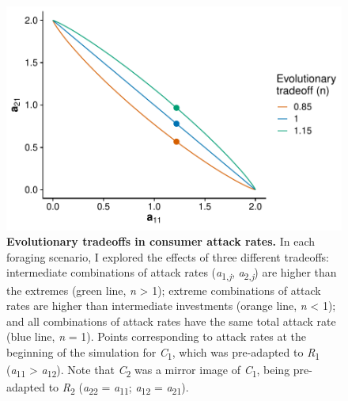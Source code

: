 \begin{figure}
\centering
\includegraphics{Fig_2_Tradeoffs.pdf}
\caption{\label{fig:tradeoff}\textbf{Evolutionary tradeoffs in consumer
attack rates.} In each foraging scenario, I explored the effects of
three different tradeoffs: intermediate combinations of attack rates
(\emph{a}\textsubscript{1,\emph{j}}, \emph{a}\textsubscript{2,\emph{j}})
are higher than the extremes (green line, \emph{n} \textgreater{} 1);
extreme combinations of attack rates are higher than intermediate
investments (orange line, \emph{n} \textless{} 1); and all combinations
of attack rates have the same total attack rate (blue line, \emph{n} =
1). Points corresponding to attack rates at the beginning of the
simulation for \emph{C}\textsubscript{1}, which was pre-adapted to
\emph{R}\textsubscript{1} (\emph{a}\textsubscript{11} \textgreater{}
\emph{a}\textsubscript{12}). Note that \emph{C}\textsubscript{2} was a
mirror image of \emph{C}\textsubscript{1}, being pre-adapted to
\emph{R}\textsubscript{2} (\emph{a}\textsubscript{22} =
\emph{a}\textsubscript{11}; \emph{a}\textsubscript{12} =
\emph{a}\textsubscript{21}).}
\end{figure}

